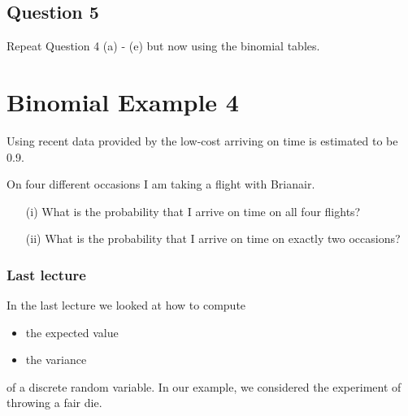 \documentclass[]{article}
\begin{document}
\subsection*{Question 5}

Repeat Question 4 (a) - (e) but now using the binomial tables.




\section{Binomial Example 4} 
Using recent data provided by the low-cost arriving on time is estimated to be 0.9. 

On four different occasions I am taking a flight with Brianair. 
\begin{itemize}
\item[(i)] What is the probability that I arrive on time on all four flights? 
\item[(ii)] What is the probability that I arrive on time on exactly two occasions? 
\end{itemize}

\subsubsection{Last lecture}
In the last lecture we looked at how to compute
\begin{itemize}
\item the expected value
\item the variance 
\end{itemize}
of a discrete random variable. In our example, we considered the experiment of throwing a fair die.
\end{document}
